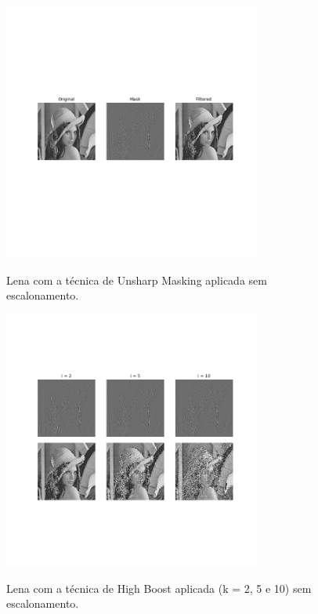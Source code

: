 \documentclass{article}
\begin{document}
\begin{figure}[H]
	\label{fig:lena_mask_without_scalling}
	\begin{minipage}[b]{1.0\linewidth}
		\centering
		\centerline{\includegraphics[width=8.5cm]{Figures/unsharp_mask_without_scalling}}
		Lena com a técnica de Unsharp Masking aplicada sem escalonamento.\medskip
	\end{minipage}
\end{figure}

\begin{figure}[H]
	\label{fig:lena_boost_without_scalling}
	\begin{minipage}[b]{1.0\linewidth}
		\centering
		\centerline{\includegraphics[width=8.5cm]{Figures/high_boost_without_scalling}}
		Lena com a técnica de High Boost aplicada (k = 2, 5 e 10) sem escalonamento.\medskip
	\end{minipage}
\end{figure}
\end{document}
